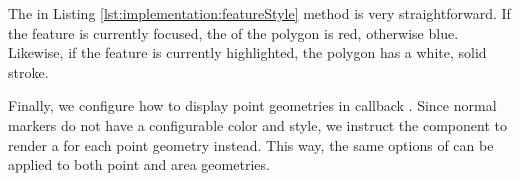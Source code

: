 

The  in Listing \ref{lst:implementation:featureStyle} method is very straightforward.
If the feature is currently focused, the  of the polygon is red, otherwise blue.
Likewise, if the feature is currently highlighted, the polygon has a white, solid stroke.



Finally, we configure how to display point geometries in callback .
Since normal markers do not have a configurable color and style, we instruct the  component to render a  for each point geometry instead.
This way, the same options of  can be applied to both point and area geometries.




